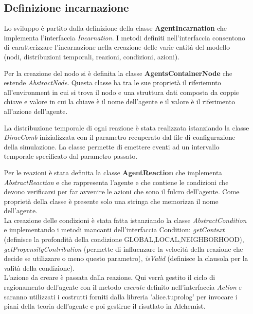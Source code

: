 \documentclass[12pt,a4paper,openright,twoside]{report}
\begin{document}
\subsection{Definizione incarnazione}
Lo sviluppo \`e partito dalla definizione della classe \textbf{AgentIncarnation} che implementa l'interfaccia \textit{Incarnation}. I metodi definiti nell'interfaccia consentono di caratterizzare l'incarnazione nella creazione delle varie entit\`a del modello (nodi, distribuzioni temporali, reazioni, condizioni, azioni).

Per la creazione del nodo si \`e definita la classe \textbf{AgentsContainerNode} che estende \textit{AbstractNode}. Questa classe ha tra le sue propriet\`a il riferiemnto all'environment in cui si trova il nodo e una struttura dati composta da coppie chiave e valore in cui la chiave \`e il nome dell'agente e il valore \`e il riferimento all'azione dell'agente.

La distribuzione temporale di ogni reazione \`e stata realizzata istanziando la classe \textit{DiracComb} inizializzata con il parametro recuperato dal file di configurazione della simulazione. La classe permette di emettere eventi ad un intervallo temporale specificato dal parametro passato.

Per le reazioni \`e stata definita la classe \textbf{AgentReaction} che implementa \textit{AbstractReaction} e che rappresenta l'agente e che contiene le condizioni che devono verificarsi per far avvenire le azioni che sono il fulcro dell'agente. Come propriet\`a della classe \`e presente solo una stringa che memorizza il nome dell'agente.
\\
La creazione delle condizioni \`e stata fatta istanziando la classe \textit{AbstractCondition} e implementando i metodi mancanti dell'interfaccia Condition: \textit{getContext} (definisce la profondit\`a della condizione GLOBAL,LOCAL,NEIGHBORHOOD), \textit{getPropensityContribution} (permette di influenzare la velocit\`a della reazione che decide se utilizzare o meno questo parametro), \textit{isValid} (definisce la clausola per la valit\`a della condizione).
\\
L'azione da creare \`e passata dalla reazione. Qui verr\`a gestito il ciclo di ragionamento dell'agente con il metodo \textit{execute} definito nell'interfaccia \textit{Action} e saranno utilizzati i costrutti forniti dalla libreria 'alice.tuprolog' per invocare i piani della teoria dell'agente e poi gestirne il risutlato in Alchemist.
\end{document}
